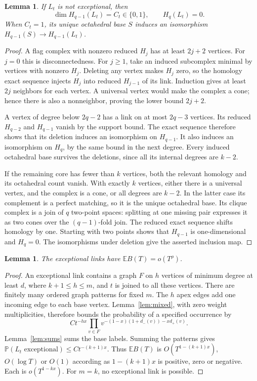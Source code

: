 \documentclass[11pt]{article}
\newtheorem{lemma}[theorem]{Lemma}
\theoremstyle{remark}\newtheorem{remark}[theorem]{Remark}
\newcommand{\E}{\mathbb E}
\newcommand{\Prob}{\mathbb P}
\begin{document}
\begin{lemma}\label{lem:core}
If $L_t$ is not exceptional, then
\[
 \dim H_{q-1}(L_t)=C_t\in\{0,1\},\qquad H_q(L_t)=0.
\]
When $C_t=1$, its unique octahedral base $S$ induces an isomorphism
$H_{q-1}(S)\to H_{q-1}(L_t)$.
\end{lemma}
\begin{proof}
A flag complex with nonzero reduced $H_j$ has at least $2j+2$ vertices.
For $j=0$ this is disconnectedness. For $j\ge1$, take an induced subcomplex
minimal by vertices with nonzero $H_j$. Deleting any vertex makes $H_j$
zero, so the homology exact sequence injects $H_j$ into reduced
$H_{j-1}$ of its link. Induction gives at least $2j$ neighbors for each
vertex. A universal vertex would make the complex a cone; hence there is
also a nonneighbor, proving the lower bound $2j+2$.

A vertex of degree below $2q-2$ has a link on at most $2q-3$ vertices.
Its reduced $H_{q-2}$ and $H_{q-1}$ vanish by the support bound. The exact
sequence therefore shows that its deletion induces an isomorphism on
$H_{q-1}$. It also induces an isomorphism on $H_q$, by the same bound
in the next degree. Every induced octahedral base survives the deletions,
since all its internal degrees are $k-2$.

If the remaining core has fewer than $k$ vertices, both the relevant
homology and its octahedral count vanish. With exactly $k$ vertices,
either there is a universal vertex, and the complex is a cone, or all
degrees are $k-2$. In the latter case its complement is a perfect matching,
so it is the unique octahedral base. Its clique complex is a join of $q$
two-point spaces: splitting at one missing pair expresses it as two cones
over the $(q-1)$-fold join. The reduced exact sequence shifts homology by
one. Starting with two points shows that $H_{q-1}$ is one-dimensional
and $H_q=0$. The isomorphisms under deletion give the asserted inclusion map.
\end{proof}

\begin{lemma}\label{lem:exceptional}
The exceptional links have $\E B(T)=o(T^\rho)$.
\end{lemma}
\begin{proof}
An exceptional link contains a graph $F$ on $h$ vertices of minimum degree
at least $d$, where $k+1\le h\le m$, and $t$ is joined to all these
vertices. There are finitely many ordered graph patterns for fixed $m$.
The $h$ apex edges add one incoming edge to each base vertex.
Lemma~\ref{lem:mixed}, with zero weight multiplicities, therefore bounds
the probability of a specified occurrence by
\[
 C t^{-hx}\prod_{v\in F}v^{-(1-x)(1+d_-(v))-x d_+(v)}.
\]
Lemma~\ref{lem:sums} sums the base labels. Summing the patterns gives
$\Prob(L_t\text{ exceptional})\le C t^{-(k+1)x}$.
Thus $\E B(T)$ is $O(T^{1-(k+1)x})$, $O(\log T)$ or $O(1)$ according
as $1-(k+1)x$ is positive, zero or negative. Each is $o(T^{1-kx})$.
For $m=k$, no exceptional link is possible.
\end{proof}
\end{document}
